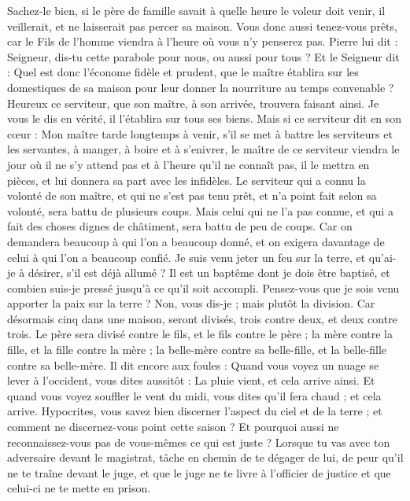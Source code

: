 \begin{multicols}{2}
Sachez-le bien, si le père de famille savait à quelle heure le voleur doit venir, il veillerait, et ne laisserait pas percer sa maison.
Vous donc aussi tenez-vous prêts, car le Fils de l'homme viendra à l'heure où vous n'y penserez pas.
Pierre lui dit : Seigneur, dis-tu cette parabole pour nous, ou aussi pour tous ?
Et le Seigneur dit : Quel est donc l'économe fidèle et prudent, que le maître établira sur les domestiques de sa maison pour leur donner la nourriture au temps convenable ?
Heureux ce serviteur, que son maître, à son arrivée, trouvera faisant ainsi.
Je vous le dis en vérité, il l'établira sur tous ses biens.
Mais si ce serviteur dit en son cœur : Mon maître tarde longtemps à venir, s'il se met à battre les serviteurs et les servantes, à manger, à boire et à s'enivrer,
le maître de ce serviteur viendra le jour où il ne s'y attend pas et à l'heure qu'il ne connaît pas, il le mettra en pièces, et lui donnera sa part avec les infidèles.
Le serviteur qui a connu la volonté de son maître, et qui ne s'est pas tenu prêt, et n'a point fait selon sa volonté, sera battu de plusieurs coups.
Mais celui qui ne l'a pas connue, et qui a fait des choses dignes de châtiment, sera battu de peu de coups. Car on demandera beaucoup à qui l'on a beaucoup donné, et on exigera davantage de celui à qui l'on a beaucoup confié.
Je suis venu jeter un feu sur la terre, et qu'ai-je à désirer, s'il est déjà allumé ?
Il est un baptême dont je dois être baptisé, et combien suis-je pressé jusqu'à ce qu'il soit accompli.
Pensez-vous que je sois venu apporter la paix sur la terre ? Non, vous dis-je ; mais plutôt la division.
Car désormais cinq dans une maison, seront divisés, trois contre deux, et deux contre trois.
Le père sera divisé contre le fils, et le fils contre le père ; la mère contre la fille, et la fille contre la mère ; la belle-mère contre sa belle-fille, et la belle-fille contre sa belle-mère.
Il dit encore aux foules : Quand vous voyez un nuage se lever à l'occident, vous dites aussitôt : La pluie vient, et cela arrive ainsi.
Et quand vous voyez souffler le vent du midi, vous dites qu'il fera chaud ; et cela arrive.
Hypocrites, vous savez bien discerner l'aspect du ciel et de la terre ; et comment ne discernez-vous point cette saison ?
Et pourquoi aussi ne reconnaissez-vous pas de vous-mêmes ce qui est juste ?
Lorsque tu vas avec ton adversaire devant le magistrat, tâche en chemin de te dégager de lui, de peur qu'il ne te traîne devant le juge, et que le juge ne te livre à l'officier de justice et que celui-ci ne te mette en prison.

\end{multicols}
